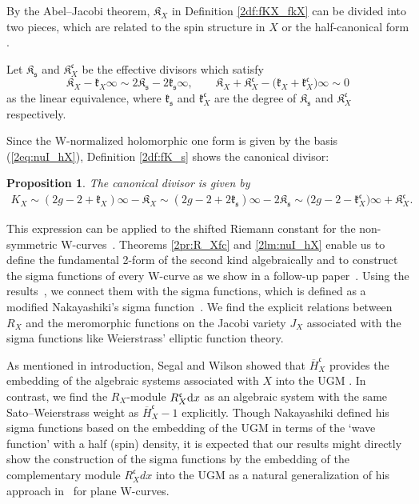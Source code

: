 \documentclass[10pt,a4paper]{amsart}
\def\fK{{\mathfrak K}}
\def\fc{{\mathfrak c}}
\def\fk{{\mathfrak k}}
\def\fs{{\mathfrak s}}
\def\BH{{\overline H}}
\numberwithin{equation}{section}
\newtheorem{Proposition}[Theorem]{Proposition}
 { \theoremstyle{definition}
\newtheorem{Definition}[Theorem]{Definition}
\newtheorem{Note}[Theorem]{Note}
\newtheorem{Example}[Theorem]{Example}
\newtheorem{Remark}[Theorem]{Remark} }
\begin{document}
By the Abel--Jacobi theorem, $\fK_X$ in Definition \ref{2df:fKX_fkX} can be divided into two pieces, which are related to the spin structure in $X$ or the half-canonical form \cite{KMP16}.

\begin{Definition}\label{2df:fK_s}
Let $\fK_\fs$ and $\fK_X^\fc$ be the effective divisors which satisfy
\[
\fK_X-\fk_X\infty \sim2\fK_\fs-2 \fk_\fs\infty,\qquad
\fK_X + \fK_X^\fc - \big(\fk_X+\fk_X^\fc\big)\infty\sim 0
\]
as the linear equivalence, where $\fk_\fs$ and $\fk_X^\fc$ are the degree of $\fK_\fs$ and $\fK_X^\fc$ respectively.
\end{Definition}

Since the W-normalized holomorphic one form is given by the basis (\ref{2eq:nuI_hX}), Definition \ref{2df:fK_s} shows the canonical divisor:

\begin{Proposition}\label{2pr:cKX}
The canonical divisor is given by
\begin{gather*}
K_X \sim(2g-2+\fk_X)\infty-\fK_X\sim (2g-2+2\fk_\fs)\infty - 2\fK_\fs
\sim \big(2g-2-\fk_X^\fc\big)\infty +\fK_X^\fc.
\end{gather*}
\end{Proposition}

This expression can be applied to the shifted Riemann constant for the non-symmetric W-curves~\cite{KMP16}.
Theorems \ref{2pr:R_Xfc} and \ref{2lm:nuI_hX} enable us to define the fundamental 2-form of the second kind algebraically and to construct the sigma functions of every W-curve as we show in a follow-up paper~\cite{KMP2022b}.
Using the results~\cite{KMP16}, we connect them with the sigma functions, which is defined as a modified Nakayashiki's sigma function~\cite{KMP2022b}.
We find the explicit relations between $R_X$ and the meromorphic functions
on the Jacobi variety $J_X$ associated with the sigma functions like Weierstrass' elliptic function theory.

As mentioned in introduction, Segal and Wilson showed that $\BH_X^\fc$ provides the embedding of the algebraic systems associated with $X$ into the UGM \cite[p.~46]{SegalWilson}.
In contrast, we find the $R_X$-module $R_X^\fc {\rm d}x$ as an algebraic system with the same Sato--Weierstrass weight as $\BH_X^\fc-1$ explicitly.
Though Nakayashiki defined his sigma functions based on the embedding of the UGM \cite{Nak16} in terms of the {\lq}wave function{\rq} with a half (spin) density, it is expected that our results might directly show the construction of the sigma functions by the embedding of the complementary module $R_X^\fc dx$ into the UGM as a natural generalization of his approach in~\cite{Nak10b} for plane W-curves.
\end{document}

